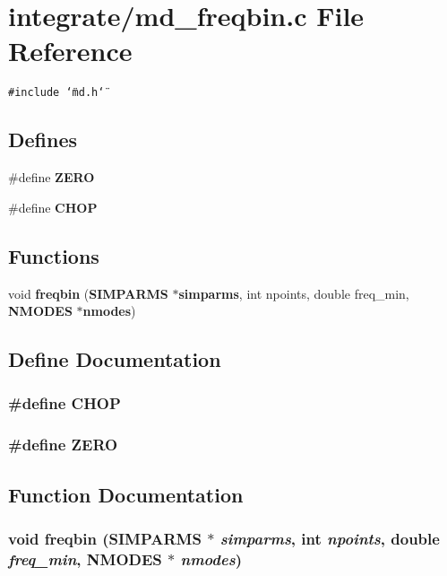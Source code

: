 \section{integrate/md\_\-freqbin.c File Reference}
\label{md__freqbin_8c}
{\tt \#include \char`\"{}md.h\char`\"{}}\par
\subsection*{Defines}
\begin{CompactItemize}
\item 
\#define {\bf ZERO}
\item 
\#define {\bf CHOP}
\end{CompactItemize}
\subsection*{Functions}
\begin{CompactItemize}
\item 
void {\bf freqbin} ({\bf SIMPARMS} $\ast${\bf simparms}, int npoints, double freq\_\-min, {\bf NMODES} $\ast${\bf nmodes})
\end{CompactItemize}


\subsection{Define Documentation}
\subsubsection{\setlength{\rightskip}{0pt plus 5cm}\#define CHOP}\label{md__freqbin_8c_4cb76941a41e637a9efb79772818eb42}


\subsubsection{\setlength{\rightskip}{0pt plus 5cm}\#define ZERO}\label{md__freqbin_8c_c328e551bde3d39b6d7b8cc9e048d941}




\subsection{Function Documentation}
\subsubsection{\setlength{\rightskip}{0pt plus 5cm}void freqbin ({\bf SIMPARMS} $\ast$ {\em simparms}, int {\em npoints}, double {\em freq\_\-min}, {\bf NMODES} $\ast$ {\em nmodes})}\label{md__freqbin_8c_79d1d3c730027b3d5e86a7d7b6c8c0b4}


